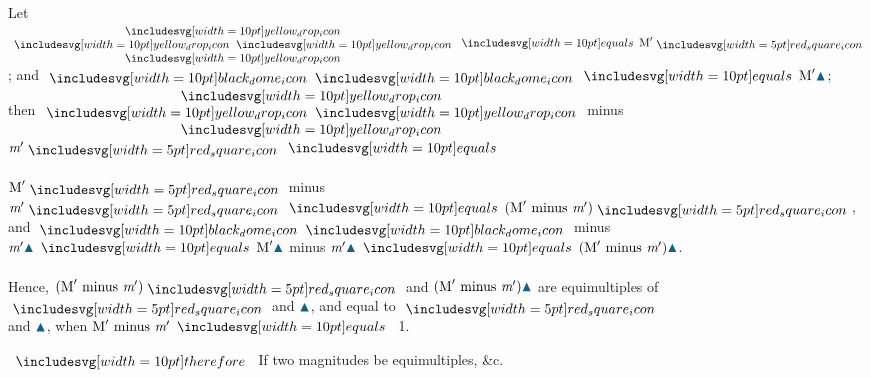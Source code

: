\documentclass[11pt,preview]{standalone}
\begin{document}
\begin{center}
    Let $\hspace{-1ex}\begin{array}{c} \yellowdrop \\ \yellowdrop \yellowdrop \\ \yellowdrop \end{array}\hspace{-1ex} \bequals \text{M}' \smallredsquare$; and $\blackdome \blackdome \bequals \text{M}' {\color{cblue}\blacktriangle}$;
    \hfill\\
    then $\hspace{-1ex}\begin{array}{c} \yellowdrop \\ \yellowdrop \yellowdrop \\ \yellowdrop \end{array}\hspace{-1ex}$ minus $\textit{m}' \smallredsquare \bequals$\\
    \hfill\\
    $\text{M}' \smallredsquare$ minus $\textit{m}' \smallredsquare \bequals (\text{M}' \text{ minus } \textit{m}') \smallredsquare$,\\
    and $\blackdome \blackdome$ minus $\textit{m}'{\color{cblue}\blacktriangle} \bequals \text{M}'{\color{cblue}\blacktriangle}$ minus $\textit{m}'{\color{cblue}\blacktriangle} \bequals (\text{M}' \text{ minus } \textit{m}'){\color{cblue}\blacktriangle}$.\\
    \hfill\\
    Hence, $(\text{M}' \text{ minus } \textit{m}')\smallredsquare$ and $(\text{M}' \text{ minus } \textit{m}') {\color{cblue}\blacktriangle}$ are equimultiples of $\smallredsquare$ and ${\color{cblue}\blacktriangle}$, and equal to $\smallredsquare$\\
    and ${\color{cblue}\blacktriangle}$, when $\text{M}' \text{ minus } \textit{m}' \bequals$ 1.\\
\end{center}

\hfill

$\btherefore$ If two magnitudes be equimultiples, \&c.
\end{document}
